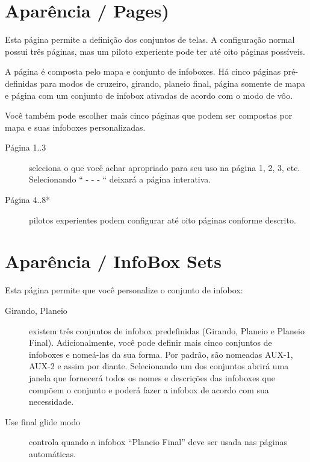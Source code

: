 \section{Aparência / Pages)}\label{conf:screenpages}

Esta página permite a definição dos conjuntos de telas.  A configuração normal possui três páginas, mas um piloto experiente pode ter até oito páginas possíveis.

A página é composta pelo mapa e conjunto de infoboxes.  Há cinco páginas pré-definidas para modos de cruzeiro, girando, planeio final, página somente de mapa e página com um conjunto de infobox ativadas de acordo com o modo de vôo.

Você também pode escolher mais cinco páginas que podem ser compostas por mapa e suas infoboxes personalizadas.


\begin{description}
\item[Página 1..3]  seleciona o que você achar apropriado para seu uso na página 1, 2, 3, etc.  Selecionando “ - - - “ deixará a página interativa.
\item[Página 4..8*]  pilotos experientes podem configurar até oito páginas conforme descrito.
\end{description}


\section{Aparência / InfoBox  Sets}\label{sec:infobox_sets}
\label{conf:infobox_sets}

Esta página permite que você personalize o conjunto de infobox:

\begin{description}
\item[Girando, Planeio]  existem três conjuntos de infobox predefinidas (Girando, Planeio e Planeio Final).  Adicionalmente, você pode definir mais cinco conjuntos de infoboxes e nomeá-las da sua forma.  Por padrão, são nomeadas AUX-1, AUX-2 e assim por diante.
Selecionando um dos conjuntos abrirá uma janela que fornecerá todos os nomes e descrições das infoboxes que compõem o conjunto e poderá fazer a infobox de acordo com sua necessidade.

\item[Use final glide modo]  controla quando a infobox “Planeio Final” deve ser usada nas páginas automáticas.
\end{description}

